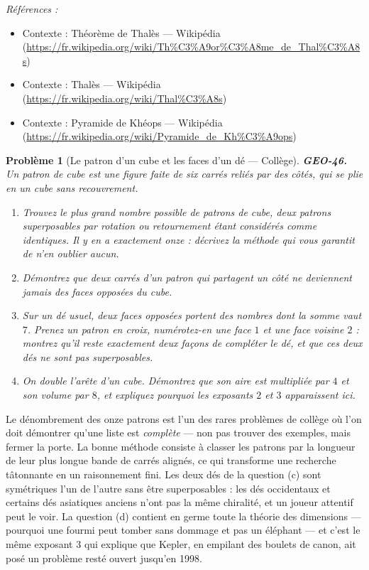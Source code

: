 \documentclass[11pt]{article}
\newtheorem{problem}{Problème}
\newenvironment{refs}{\par\small\noindent\emph{Références :}\begin{itemize}\setlength\itemsep{0pt}}{\end{itemize}\normalsize}
\begin{document}
\begin{refs}
\item Contexte : Théorème de Thalès --- Wikipédia (\url{https://fr.wikipedia.org/wiki/Th%C3%A9or%C3%A8me_de_Thal%C3%A8s})
\item Contexte : Thalès --- Wikipédia (\url{https://fr.wikipedia.org/wiki/Thal%C3%A8s})
\item Contexte : Pyramide de Khéops --- Wikipédia (\url{https://fr.wikipedia.org/wiki/Pyramide_de_Kh%C3%A9ops})
\end{refs}

\bigskip

\begin{problem}[{Le patron d'un cube et les faces d'un dé --- Collège}]
\textbf{GEO-46.} Un patron de cube est une figure faite de six carrés reliés par des côtés, qui se
plie en un cube sans recouvrement.
\begin{enumerate}
\item[(a)] Trouvez le plus grand nombre possible de patrons de cube, deux patrons superposables par rotation
ou retournement étant considérés comme identiques. Il y en a exactement onze : décrivez la méthode qui
vous garantit de n'en oublier aucun.
\item[(b)] Démontrez que deux carrés d'un patron qui partagent un côté ne deviennent jamais des faces
opposées du cube.
\item[(c)] Sur un dé usuel, deux faces opposées portent des nombres dont la somme vaut $ 7 $. Prenez un
patron en croix, numérotez-en une face $ 1 $ et une face voisine $ 2 $ : montrez qu'il reste
exactement deux façons de compléter le dé, et que ces deux dés ne sont pas superposables.
\item[(d)] On double l'arête d'un cube. Démontrez que son aire est multipliée par $ 4 $ et son volume par
$ 8 $, et expliquez pourquoi les exposants $ 2 $ et $ 3 $ apparaissent ici.
\end{enumerate}

\end{problem}

\noindent Le dénombrement des onze patrons est l'un des rares problèmes de collège où l'on
doit démontrer qu'une liste est \textit{complète} --- non pas trouver des exemples, mais fermer la porte.
La bonne méthode consiste à classer les patrons par la longueur de leur plus longue bande de carrés
alignés, ce qui transforme une recherche tâtonnante en un raisonnement fini. Les deux dés de la
question (c) sont symétriques l'un de l'autre sans être superposables : les dés occidentaux et
certains dés asiatiques anciens n'ont pas la même chiralité, et un joueur attentif peut le voir. La
question (d) contient en germe toute la théorie des dimensions --- pourquoi une fourmi peut tomber sans
dommage et pas un éléphant --- et c'est le même exposant $ 3 $ qui explique que Kepler, en empilant
des boulets de canon, ait posé un problème resté ouvert jusqu'en 1998.
\end{document}
